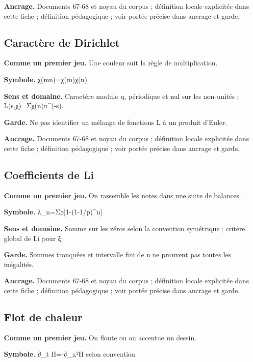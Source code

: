 \documentclass[
  9pt,
  a4paper,
]{article}
\begin{document}
\textbf{Ancrage.} Documents 67-68 et noyau du corpus ; définition locale
explicitée dans cette fiche ; définition pédagogique ; voir portée
précise dans ancrage et garde.

\hypertarget{caractuxe8re-de-dirichlet}{%
\subsection{Caractère de Dirichlet}\label{caractuxe8re-de-dirichlet}}

\textbf{Comme un premier jeu.} Une couleur suit la règle de
multiplication.

\textbf{Symbole.} χ(mn)=χ(m)χ(n)

\textbf{Sens et domaine.} Caractère modulo q, périodique et nul sur les
non-unités ; L(s,χ)=Σχ(n)n\^{}(-s).

\textbf{Garde.} Ne pas identifier un mélange de fonctions L à un produit
d'Euler.

\textbf{Ancrage.} Documents 67-68 et noyau du corpus ; définition locale
explicitée dans cette fiche ; définition pédagogique ; voir portée
précise dans ancrage et garde.

\hypertarget{coefficients-de-li}{%
\subsection{Coefficients de Li}\label{coefficients-de-li}}

\textbf{Comme un premier jeu.} On rassemble les notes dans une suite de
balances.

\textbf{Symbole.} λ\_n=Σρ{[}1-(1-1/ρ)\^{}n{]}

\textbf{Sens et domaine.} Somme sur les zéros selon la convention
symétrique ; critère global de Li pour ξ.

\textbf{Garde.} Sommes tronquées et intervalle fini de n ne prouvent pas
toutes les inégalités.

\textbf{Ancrage.} Documents 67-68 et noyau du corpus ; définition locale
explicitée dans cette fiche ; définition pédagogique ; voir portée
précise dans ancrage et garde.

\hypertarget{flot-de-chaleur}{%
\subsection{Flot de chaleur}\label{flot-de-chaleur}}

\textbf{Comme un premier jeu.} On floute ou on accentue un dessin.

\textbf{Symbole.} ∂\_t H=-∂\_x²H selon convention
\end{document}
